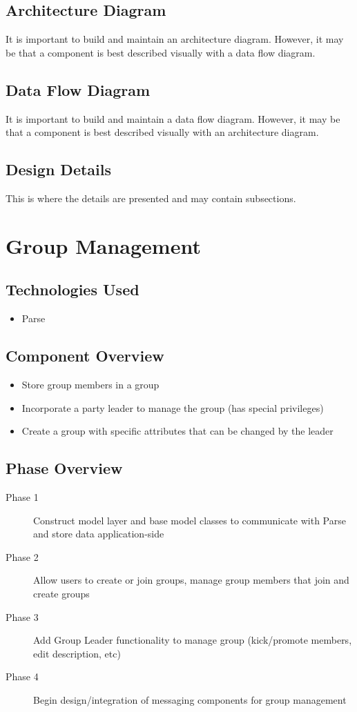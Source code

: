 \subsection{ Architecture  Diagram}
It is important to build and maintain an architecture diagram.  However, it may 
be that a component is best described visually with a data flow diagram. 

\subsection{Data Flow Diagram}
It is important to build and maintain a data flow diagram.  However, it may be 
that a component is best described visually with an architecture diagram. 


\subsection{Design Details}
This is where the details are presented and may contain subsections. 

\section{Group Management }

\subsection{Technologies  Used}
\begin{itemize}
  \item Parse
\end{itemize}

\subsection{Component  Overview}
\begin{itemize}
  \item Store group members in a group
  \item Incorporate a party leader to manage the group (has special privileges)
  \item Create a group with specific attributes that can be changed by the leader
\end{itemize}

\subsection{Phase Overview}
\begin{description}
  \item [Phase 1] Construct model layer and base model classes to communicate with Parse and store data application-side
  \item [Phase 2] Allow users to create or join groups, manage group members that join and create groups
  \item [Phase 3] Add Group Leader functionality to manage group (kick/promote members, edit description, etc)
  \item [Phase 4] Begin design/integration of messaging components for group management
\end{description}
